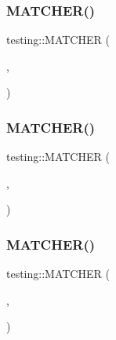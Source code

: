 \mbox{\label{namespacetesting_a4fcb3f407119590471bea5a90a8d2dda}} 
\subsubsection{\texorpdfstring{MATCHER()}{MATCHER()}\hspace{0.1cm}{\footnotesize\ttfamily [1/3]}}
{\footnotesize\ttfamily testing\+::\+M\+A\+T\+C\+H\+ER (\begin{DoxyParamCaption}\item[{Is\+Empty}]{,  }\item[{negation ? \char`\"{}isn\textquotesingle{}t empty\char`\"{} \+:\char`\"{}is empty\char`\"{}}]{ }\end{DoxyParamCaption})}

\mbox{\label{namespacetesting_ab2b645db6909220993662cf43ed0d9e8}} 
\subsubsection{\texorpdfstring{MATCHER()}{MATCHER()}\hspace{0.1cm}{\footnotesize\ttfamily [2/3]}}
{\footnotesize\ttfamily testing\+::\+M\+A\+T\+C\+H\+ER (\begin{DoxyParamCaption}\item[{Is\+True}]{,  }\item[{negation ? \char`\"{}is false\char`\"{} \+:\char`\"{}is true\char`\"{}}]{ }\end{DoxyParamCaption})}

\mbox{\label{namespacetesting_a03fb223cceaefc67991ac36286dcbb34}} 
\subsubsection{\texorpdfstring{MATCHER()}{MATCHER()}\hspace{0.1cm}{\footnotesize\ttfamily [3/3]}}
{\footnotesize\ttfamily testing\+::\+M\+A\+T\+C\+H\+ER (\begin{DoxyParamCaption}\item[{Is\+False}]{,  }\item[{negation ? \char`\"{}is true\char`\"{} \+:\char`\"{}is false\char`\"{}}]{ }\end{DoxyParamCaption})}

